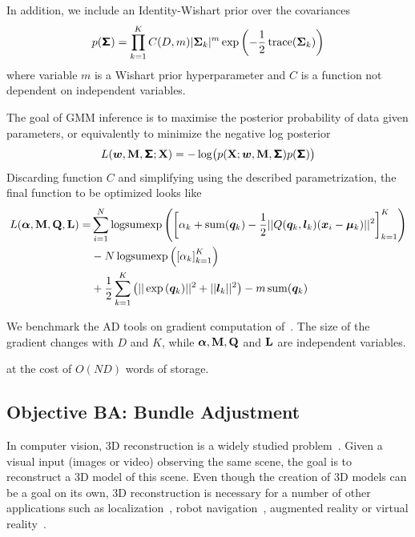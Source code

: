 \documentclass[suppldata]{article}
\begin{document}
In addition, we include an Identity-Wishart prior over the covariances
\begin{equation}
    p(\bm{\mathsf \Sigma}) = 
\prod_{k=1}^K C(D,m)|{\bf \Sigma}_k|^m \exp\left(-\frac12 \operatorname{trace}({\bf \Sigma}_k)\right) 
\end{equation}
where variable $m$ is a Wishart prior hyperparameter and $C$ is a function not dependent on independent variables.  


The goal of GMM inference is to maximise the posterior probability of data given parameters, or equivalently to minimize the negative log posterior
\[
    L(\bm{w},{\bf M},\bm{\mathsf \Sigma}; {\bf X}) = -\log\bigl(p({\bf X};\bm{w},{\bf M},\bm{\mathsf \Sigma}) p(\bm{\mathsf \Sigma})\bigr)
\]
Discarding function $C$ and simplifying using the described parametrization, the final function to be optimized looks like
\begin{align}
L(\valpha,\mMu,\mQ,\mL) = 
&\sum_{i=1}^N{\logsumexp\left(\left[\alpha_k + \operatorname{sum}(\vq_k) - \frac{1}{2}||Q(\vq_k,\vl_k)(\vx_i-\vmu_k)||^2\right]_{k=1}^K\right)} \nonumber\\
&- N \logsumexp\left(\left[\alpha_k\right]_{k=1}^K\right) \label{eq:gmm}\\
&+ \frac{1}{2} \sum_{k=1}^{K}{\left(||\exp{(\vq_k)}||^2 + ||\vl_k||^2\right)} - m \operatorname{sum}(\vq_k) \nonumber
\end{align}

We benchmark the AD tools on gradient computation of~. The size of the gradient changes with $D$ and $K$, while $\bm{\alpha}, {\bf M}, {\bf Q}$ and ${\bf L}$ are independent variables.

at the cost of $O(ND)$ words of storage.

\subsection{Objective BA: Bundle Adjustment}
\label{sec:ba}
In computer vision, 3D reconstruction is a widely studied problem~\cite{Snavely-siggraph06,Agarwal-acm11}. Given a visual input (\eg images or video) observing the same scene, the goal is to reconstruct a 3D model of this scene. Even though the creation of 3D models can be a goal on its own, 3D reconstruction is necessary for a number of other applications such as localization~\cite{Sattler12-localization}, robot navigation~\cite{Davison07monoslam}, augmented reality or virtual reality~\cite{Shapira16reality}.
\end{document}
